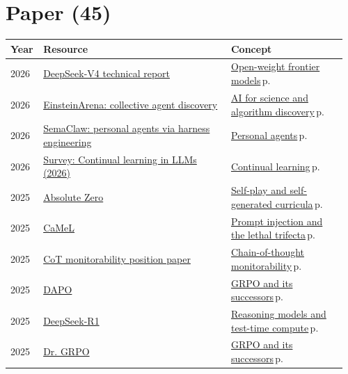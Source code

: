 \documentclass[10pt,a4paper,openany]{report}
\begin{document}
\section{Paper (45)}
{\small\begin{longtable}{@{}p{0.07\linewidth}>{\raggedright}p{0.55\linewidth}>{\raggedright\arraybackslash}p{0.34\linewidth}@{}}
\textbf{\sffamily Year} & \textbf{\sffamily Resource} & \textbf{\sffamily Concept}\\ \hline\endhead
2026 & \href{https://arxiv.org/abs/2606.19348}{DeepSeek-V4 technical report} & \hyperref[c:landscape-3]{Open-weight frontier models}\,{\color{muted}\scriptsize p.\,\pageref{c:landscape-3}}\\
2026 & \href{https://arxiv.org/abs/2606.10402}{EinsteinArena: collective agent discovery} & \hyperref[c:embodied-7]{AI for science and algorithm discovery}\,{\color{muted}\scriptsize p.\,\pageref{c:embodied-7}}\\
2026 & \href{https://arxiv.org/abs/2604.11548}{SemaClaw: personal agents via harness engineering} & \hyperref[c:agents-10]{Personal agents}\,{\color{muted}\scriptsize p.\,\pageref{c:agents-10}}\\
2026 & \href{https://arxiv.org/abs/2603.12658}{Survey: Continual learning in LLMs (2026)} & \hyperref[c:reasoning-11]{Continual learning}\,{\color{muted}\scriptsize p.\,\pageref{c:reasoning-11}}\\
2025 & \href{https://arxiv.org/abs/2505.03335}{Absolute Zero} & \hyperref[c:reasoning-10]{Self-play and self-generated curricula}\,{\color{muted}\scriptsize p.\,\pageref{c:reasoning-10}}\\
2025 & \href{https://arxiv.org/abs/2503.18813}{CaMeL} & \hyperref[c:safety-3]{Prompt injection and the lethal trifecta}\,{\color{muted}\scriptsize p.\,\pageref{c:safety-3}}\\
2025 & \href{https://arxiv.org/abs/2507.11473}{CoT monitorability position paper} & \hyperref[c:safety-8]{Chain-of-thought monitorability}\,{\color{muted}\scriptsize p.\,\pageref{c:safety-8}}\\
2025 & \href{https://arxiv.org/abs/2503.14476}{DAPO} & \hyperref[c:reasoning-4]{GRPO and its successors}\,{\color{muted}\scriptsize p.\,\pageref{c:reasoning-4}}\\
2025 & \href{https://arxiv.org/abs/2501.12948}{DeepSeek-R1} & \hyperref[c:reasoning-0]{Reasoning models and test-time compute}\,{\color{muted}\scriptsize p.\,\pageref{c:reasoning-0}}\\
2025 & \href{https://arxiv.org/abs/2503.20783}{Dr. GRPO} & \hyperref[c:reasoning-4]{GRPO and its successors}\,{\color{muted}\scriptsize p.\,\pageref{c:reasoning-4}}\\

\end{longtable}}
\end{document}
